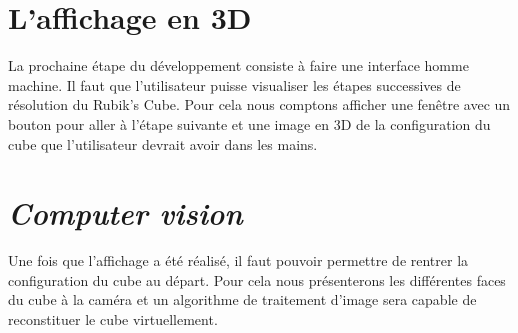 \section{L'affichage en 3D}
La prochaine étape du développement consiste à faire une interface homme machine. Il faut que l'utilisateur puisse visualiser les étapes successives de résolution du Rubik's Cube. Pour cela nous comptons afficher une fenêtre avec un bouton pour aller à l'étape suivante et une image en 3D de la configuration du cube que l'utilisateur devrait avoir dans les mains.

\section{\textit{Computer vision}}
Une fois que l'affichage a été réalisé, il faut pouvoir permettre de rentrer la configuration du cube au départ. Pour cela nous présenterons les différentes faces du cube à la caméra et un algorithme de traitement d'image sera capable de reconstituer le cube virtuellement.


